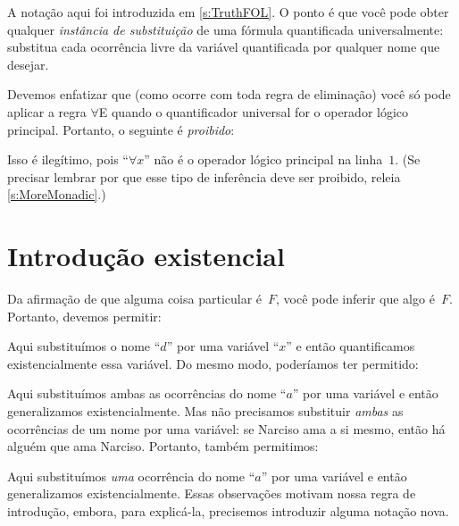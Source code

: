 A notação aqui foi introduzida em \cref{s:TruthFOL}. O ponto é
que você pode obter qualquer \emph{instância de substituição} de uma fórmula
quantificada universalmente: substitua cada ocorrência livre da variável
quantificada por qualquer nome que desejar.

Devemos enfatizar que (como ocorre com toda regra de eliminação) você só pode aplicar a regra $\forall$E quando o quantificador universal for o operador lógico principal. Portanto, o seguinte é \emph{proibido}:
\begin{fitchproof}
	\PR
\end{fitchproof}
Isso é ilegítimo, pois \textquotedblleft $\forall x$\textquotedblright{} não é o operador lógico principal na linha~$1$. (Se precisar lembrar por que esse tipo de inferência deve ser proibido, releia \cref{s:MoreMonadic}.)

\section{Introdução existencial}\label{s:existsIntro}

Da afirmação de que alguma coisa particular é~$F$, você pode inferir que algo é~$F$. Portanto, devemos permitir:
\begin{fitchproof}
	\PR
	 
\end{fitchproof}
Aqui substituímos o nome \textquotedblleft $d$\textquotedblright{} por uma variável \textquotedblleft $x$\textquotedblright{} e então quantificamos existencialmente essa variável. Do mesmo modo, poderíamos ter permitido:
\begin{fitchproof}
	\PR
	 
\end{fitchproof}
Aqui substituímos ambas as ocorrências do nome \textquotedblleft $a$\textquotedblright{} por uma variável e então generalizamos existencialmente. Mas não precisamos substituir \emph{ambas} as ocorrências de um nome por uma variável: se Narciso ama a si mesmo, então há alguém que ama Narciso. Portanto, também permitimos:
\begin{fitchproof}
	\PR
	 
\end{fitchproof}
Aqui substituímos \emph{uma} ocorrência do nome \textquotedblleft $a$\textquotedblright{} por uma variável e então generalizamos existencialmente. Essas observações motivam nossa regra de introdução, embora, para explicá-la, precisemos introduzir alguma notação nova.

